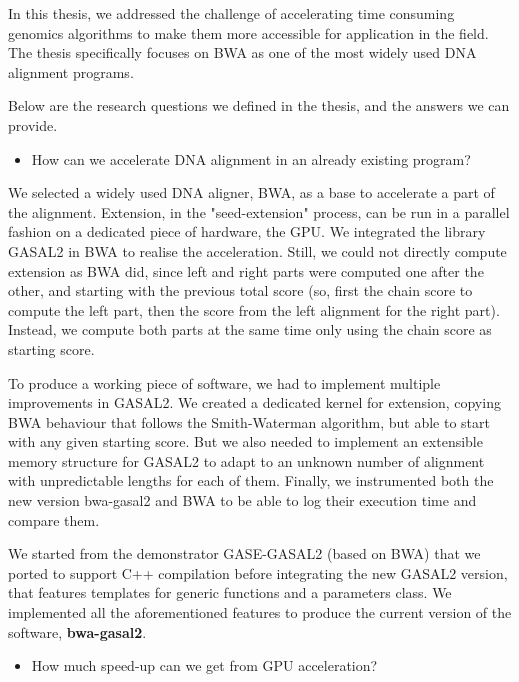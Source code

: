 

In this thesis, we addressed the challenge of accelerating time consuming genomics algorithms to make them more accessible for application in the field. The thesis specifically focuses on BWA as one of the most widely used DNA alignment programs. 

Below are the research questions we defined in the thesis, and the answers we can provide.

\begin{itemize}
	\item How can we accelerate DNA alignment in an already existing program?
\end{itemize}	

We selected a widely used DNA aligner, BWA, as a base to accelerate a part of the alignment. Extension, in the "seed-extension" process, can be run in a parallel fashion on a dedicated piece of hardware, the GPU. We integrated the library GASAL2 in BWA to realise the acceleration. Still, we could not directly compute extension as BWA did, since left and right parts were computed one after the other, and starting with the previous total score (so, first the chain score to compute the left part, then the score from the left alignment for the right part). Instead, we compute both parts at the same time only using the chain score as starting score.

To produce a working piece of software, we had to implement multiple improvements in GASAL2. We created a dedicated kernel for extension, copying BWA behaviour that follows the Smith-Waterman algorithm, but able to start with any given starting score. But we also needed to implement an extensible memory structure for GASAL2 to adapt to an unknown number of alignment with unpredictable lengths for each of them. Finally, we instrumented both the new version bwa-gasal2 and BWA to be able to log their execution time and compare them. 

We started from the demonstrator GASE-GASAL2 (based on BWA) that we ported to support C++ compilation before integrating the new GASAL2 version, that features templates for generic functions and a parameters class. We implemented all the aforementioned features to produce the current version of the software, \textbf{bwa-gasal2}.

\begin{itemize}
	\item How much speed-up can we get from GPU acceleration?
\end{itemize}

